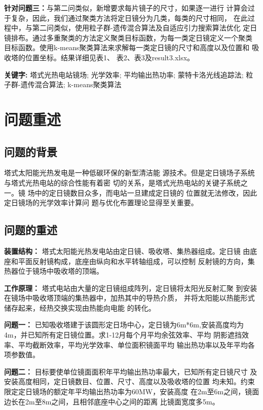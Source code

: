 \documentclass{数学建模}
\begin{document}
\textbf{针对问题三：}与第二问类似，新增要求每片镜子的尺寸，如果逐一进行
计算会过于复杂，因此，我们通过聚类方法将定日镜分为几类，每类的尺寸相同，
在此过程中，与第二问类似，使用粒子群-遗传混合算法及自适应引力搜索算法优化
定日镜排布。通过多重聚类的方法定义聚类目标函数，为每一类定日镜定义一个聚类
目标函数。使用k-means聚类算法来求解每一类定日镜的尺寸和高度以及位置和
吸收塔的位置坐标。结果详细见表1、
表2、表3及result3.xlsx。

\noindent {}\textbf{ 关键字:} 塔式光热电站镜场; 光学效率; 
平均输出热功率; 蒙特卡洛光线追踪法; 粒子群-遗传混合算法; k-means聚类算法

\newpage

\section{问题重述}
\subsection{问题的背景}

塔式太阳能光热发电是一种低碳环保的新型清洁能
源技术。但是定日镜场子系统与塔式光热电站的综合性能有着密
切的关系，是塔式光热电站的关键子系统之一。镜
场中的定日镜数目众多，而电站一旦建成定日镜的
位置就无法修改，因此定日镜场的光学效率计算问
题与优化布置理论显得至关重要。


\subsection{问题的重述}

\textbf{装置结构：}
塔式太阳能光热发电站由定日镜、吸收塔、集热器组成。定日镜
由底座和平面反射镜构成，底座由纵向和水平转轴组成，可以控制
反射镜的方向，集热器位于镜场中吸收塔的顶端。

\textbf{工作原理：}
塔式电站由大量的定日镜组成阵列，定日镜将太阳光反射汇聚
到安装在镜场中吸收塔顶端的集热器中，加热其中的导热介质，
并将太阳能以热能形式储存起来，经热交换实现由热能向电能
的转化。

\textbf{问题一：}
已知吸收塔建于该圆形定日场中心，定日镜为6m*6m,安装高度均为
4m，并已知所有定日镜位置。求1-12月每个月平均余弦效率、平均
阴影遮挡效率、平均截断效率，平均光学效率、单位面积镜面平均
输出热功率以及年平均各项参数值。

\textbf{问题二：}
目标要使单位镜面面积年平均输出热功率最大，已知所有定日镜尺寸
及安装高度相同，定日镜数目、位置、尺寸、高度以及吸收塔的位置
均未知。约束限定定日镜场的额定年平均输出热功率为60MW，安装高度
在2m至6m之间，镜面边长在2m至8m之间，且相邻底座中心之间的距离
比镜面宽度多5m。
\end{document}
